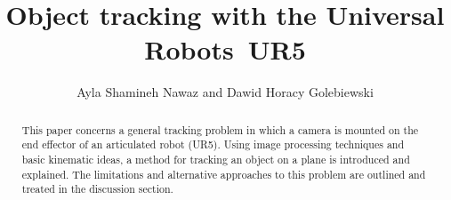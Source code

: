 \documentclass[letterpaper, 10 pt, conference]{ieeeconf}  %
\title{\LARGE \bf
	Object tracking with the Universal Robots\texttrademark \ UR5  
}
\author{Ayla Shamineh Nawaz and Dawid Horacy Golebiewski}%
\begin{document}
\maketitle
\thispagestyle{empty}
\pagestyle{empty}


\begin{abstract}
This paper concerns a general tracking problem in which a camera is mounted on the end effector of an articulated robot (UR5). Using image processing techniques and basic kinematic ideas, a method for tracking an object on a plane is introduced and explained. The limitations and alternative approaches to this problem are outlined and treated in the discussion section.
\end{abstract}


\end{document}
